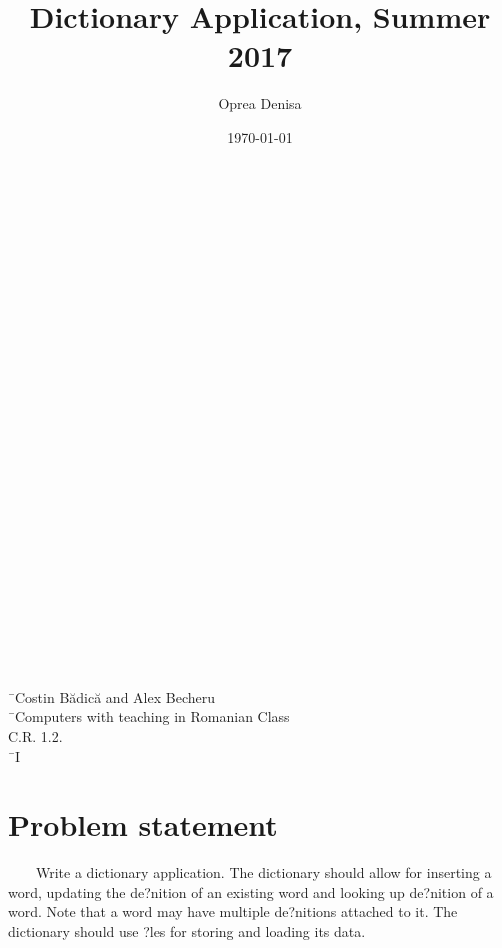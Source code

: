 \documentclass{article}
\begin{document}

\title{Dictionary Application, Summer 2017}
\author{Oprea Denisa}
\date{\today}
\maketitle

\begin{tabbing}
\\ \\ \\ \\ \\ \\ \\ \\ \\ \\ \\ \\ \\ \\ \\ \\ \\ \\ \\ \\ \\ \\ \\ \\
\end{tabbing}

\begin{tabbing}
  \=\ {Costin B\u{a}dic\u{a} and Alex Becheru} \\
   \=\  {Computers with teaching in Romanian Class} \\
      \>  C.R. 1.2.  \\
 \=\ {I}

\end{tabbing}

\pagebreak
\section{Problem statement}
\ \ \ \ Write a dictionary application. The dictionary should allow for inserting a word, updating the de?nition of an existing word and looking up de?nition of a word. Note that a word may have multiple de?nitions attached to it. The dictionary should use ?les for storing and loading its data. 
\end{document}
